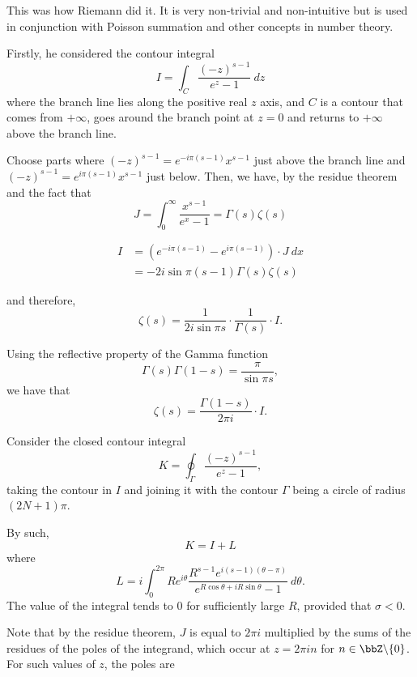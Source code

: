 \documentclass[a4paper, 12pt,oneside,openany]{book}
\begin{document}

 This was how Riemann did it. It is very non-trivial and non-intuitive but is used in conjunction with Poisson summation and other concepts in number theory.

Firstly, he considered the contour integral $$I=\int_C \frac{(-z)^{s-1}}{e^z-1}\ dz$$ where the branch line lies along the positive real $z$ axis, and $C$ is a contour that comes from $+\infty$, goes around the branch point at $z=0$ and returns to $+\infty$ above the branch line.

Choose parts where $(-z)^{s-1}=e^{-i\pi(s-1)}x^{s-1}$ just above the branch line and $(-z)^{s-1}=e^{i\pi(s-1)}x^{s-1}$ just below. Then, we have, by the residue theorem and the fact that $$J=\int_0^\infty \frac{x^{s-1}}{e^x-1}=\Gamma(s)\zeta(s)$$

\begin{align*} 
	I &=(e^{-i\pi(s-1)}-e^{i\pi(s-1)})\cdot J \ dx  \\
	&= -2i\sin\pi(s-1) \Gamma(s)\zeta(s)
\end{align*} 

and therefore, $$\zeta(s)=\frac{1}{2i \sin{\pi s}} \cdot 
\frac{1}{\Gamma(s)} \cdot I.$$

Using the reflective property of the Gamma function $$\Gamma(s)\Gamma(1-s)=\frac{\pi}{\sin{\pi s}},$$ we have that $$\zeta(s)=\frac{\Gamma(1-s)}{2\pi i} \cdot I.$$

Consider the closed contour integral $$K=\oint_\Gamma \frac{(-z)^{s-1}}{e^z-1},$$ taking the contour in $I$ and joining it with the contour $\Gamma$ being a circle of radius $(2N+1)\pi$. 

By such, $$K=I+L$$ where $$L=i\int_0^{2\pi} Re^{i\theta} \frac{R^{s-1}e^{i(s-1)(\theta-\pi)}}{e^{R\cos\theta+i R\sin\theta}-1}\ d\theta.$$ The value of the integral tends to $0$ for sufficiently large $R$, provided that $\sigma<0$.

Note that by the residue theorem, $J$ is equal to $2\pi i$ multiplied by the sums of the residues of the poles of the integrand, which occur at $z=2\pi in$ for $n\in \bbZ \backslash \{0\} $. For such values of $z$, the poles are 
\end{document}
